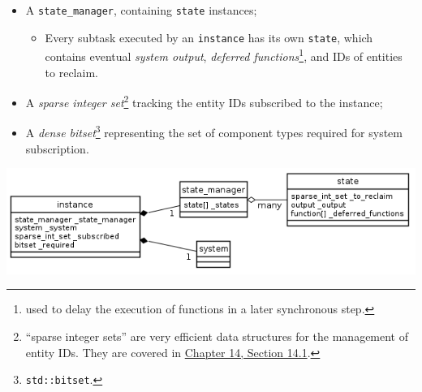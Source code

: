 \documentclass[twoside, 12pt, a4paper, openany]{book}
\let\origfigure=\figure
\let\endorigfigure=\endfigure
\renewenvironment{figure}[1][]{%
\origfigure[H]
}{%
\endorigfigure
}
\providecommand{\tightlist}{%
  \setlength{\itemsep}{0pt}\setlength{\parskip}{0pt}}
\begin{document}
\begin{itemize}
\item
  A
  \texttt{state_manager},
  containing
  \texttt{state}
  instances;

  \begin{itemize}
  \tightlist
  \item
    Every subtask executed by an
    \texttt{instance}
    has its own
    \texttt{state},
    which contains eventual \emph{system output}, \emph{deferred
    functions}\footnote{used to delay the execution of functions in a
      later synchronous step.}, and IDs of entities to reclaim.
  \end{itemize}
\item
  A \emph{sparse integer set}\footnote{``sparse integer sets'' are very
    efficient data structures for the management of entity IDs. They are
    covered in \protect\hyperlink{appendix_sparse_integer_sets}{Chapter
    14, Section 14.1}.} tracking the entity IDs subscribed to the
  instance;
\item
  A \emph{dense bitset}\footnote{\texttt{std::bitset}.}
  representing the set of component types required for system
  subscription.
\end{itemize}

\begin{figure}[htbp]
\centering
\includegraphics{source/figures/generated/ecst/architecture/instance.png}
\caption{ECST architecture: system instance}
\end{figure}
\end{document}

